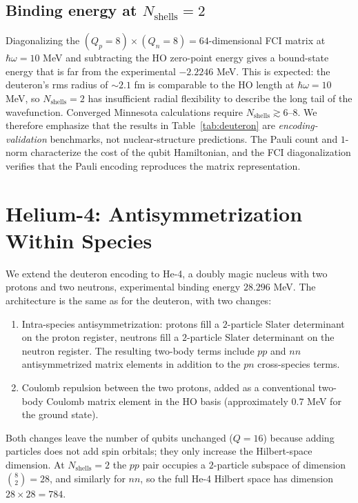 \documentclass[twocolumn,prc,amsmath,amssymb,superscriptaddress]{revtex4-2}
\begin{document}
\subsection{Binding energy at $N_{\mathrm{shells}}=2$}

Diagonalizing the $(Q_p = 8)\times(Q_n = 8) = 64$-dimensional FCI
matrix at $\hbar\omega = 10$ MeV and subtracting the HO zero-point
energy gives a bound-state energy that is far from the experimental
$-2.2246$ MeV. This is expected: the deuteron's rms radius of
$\sim 2.1$ fm is comparable to the HO length at $\hbar\omega = 10$
MeV, so $N_{\mathrm{shells}}=2$ has insufficient radial flexibility to
describe the long tail of the wavefunction. Converged Minnesota
calculations require $N_{\mathrm{shells}} \gtrsim 6$--$8$. We therefore
emphasize that the results in Table~\ref{tab:deuteron} are
\emph{encoding-validation} benchmarks, not nuclear-structure
predictions. The Pauli count and $1$-norm characterize the cost of
the qubit Hamiltonian, and the FCI diagonalization verifies that the
Pauli encoding reproduces the matrix representation.

\section{Helium-4: Antisymmetrization Within Species}
\label{sec:he4}

We extend the deuteron encoding to He-4, a doubly magic nucleus with
two protons and two neutrons, experimental binding energy $28.296$
MeV. The architecture is the same as for the deuteron, with two
changes:

\begin{enumerate}
  \item Intra-species antisymmetrization: protons fill a $2$-particle
    Slater determinant on the proton register, neutrons fill a
    $2$-particle Slater determinant on the neutron register. The
    resulting two-body terms include $pp$ and $nn$ antisymmetrized
    matrix elements in addition to the $pn$ cross-species terms.
  \item Coulomb repulsion between the two protons, added as a
    conventional two-body Coulomb matrix element in the HO basis
    (approximately $0.7$ MeV for the ground state).
\end{enumerate}

Both changes leave the number of qubits unchanged ($Q = 16$) because
adding particles does not add spin orbitals; they only increase the
Hilbert-space dimension. At $N_{\mathrm{shells}}=2$ the $pp$ pair
occupies a $2$-particle subspace of dimension $\binom{8}{2} = 28$, and
similarly for $nn$, so the full He-4 Hilbert space has dimension
$28 \times 28 = 784$.
\end{document}
